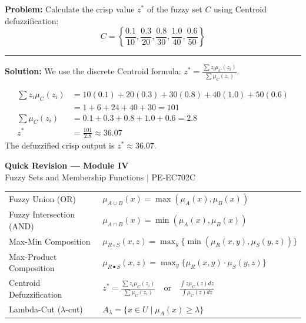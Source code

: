 \documentclass[12pt,a4paper]{article}
\renewcommand{\arraystretch}{1.45}
\begin{document}
\begin{tcolorbox}[examplebox, title={Discrete Centroid Defuzzification}]
\textbf{Problem:} Calculate the crisp value $z^*$ of the fuzzy set $C$ using Centroid defuzzification:
\begin{equation*}
  C = \left\{ \frac{0.1}{10}, \frac{0.3}{20}, \frac{0.8}{30}, \frac{1.0}{40}, \frac{0.6}{50} \right\}
\end{equation*}
\par\vspace{4pt}\noindent\rule{\linewidth}{0.5pt}\par
\textbf{Solution:}
We use the discrete Centroid formula: $z^* = \frac{\sum z_i \mu_C(z_i)}{\sum \mu_C(z_i)}$.
\par\vspace{4pt}
\begin{align*}
  \sum z_i \mu_C(z_i) &= 10(0.1) + 20(0.3) + 30(0.8) + 40(1.0) + 50(0.6) \\
  &= 1 + 6 + 24 + 40 + 30 = 101 \\
  \sum \mu_C(z_i) &= 0.1 + 0.3 + 0.8 + 1.0 + 0.6 = 2.8 \\
  z^* &= \frac{101}{2.8} \approx 36.07
\end{align*}
The defuzzified crisp output is $z^* \approx 36.07$.
\end{tcolorbox}

\newpage

\begin{center}
  {\large\bfseries\color{myred} Quick Revision --- Module IV}\\[3pt]
  {\small\color{mydark} Fuzzy Sets and Membership Functions $|$ PE-EC702C}
\end{center}
\noindent{\color{myred}\rule{\linewidth}{1.2pt}}
\vspace{4pt}

\begin{tcolorbox}[formulabox, title={\textbf{Key Formulas at a Glance}}]
\renewcommand{\arraystretch}{1.3}
\begin{tabularx}{\linewidth}{B{5.0cm} X}Fuzzy Union (OR) & $\mu_{A \cup B}(x) = \max(\mu_A(x), \mu_B(x))$ \\
Fuzzy Intersection (AND) & $\mu_{A \cap B}(x) = \min(\mu_A(x), \mu_B(x))$ \\
Max-Min Composition & $\mu_{R \circ S}(x, z) = \max_y \{ \min( \mu_R(x,y), \mu_S(y,z) ) \}$ \\
Max-Product Composition & $\mu_{R \bullet S}(x, z) = \max_y \{ \mu_R(x,y) \cdot \mu_S(y,z) \}$ \\
Centroid Defuzzification & $z^* = \frac{\sum z_i \mu_C(z_i)}{\sum \mu_C(z_i)} \quad \text{or} \quad \frac{\int z \mu_C(z) dz}{\int \mu_C(z) dz}$ \\
Lambda-Cut ($\lambda$-cut) & $A_{\lambda} = \{ x \in U \mid \mu_A(x) \ge \lambda \}$
\end{tabularx}
\end{tcolorbox}
\end{document}

